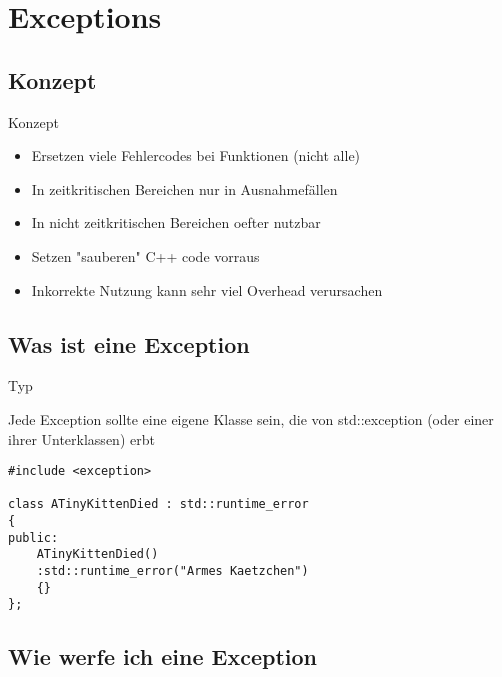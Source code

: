\section{Exceptions}


\subsection{Konzept}

\begin{frame}{Konzept}
	\begin{itemize}
		\item Ersetzen viele Fehlercodes bei Funktionen (nicht alle)
		\item In zeitkritischen Bereichen nur in Ausnahmefällen
		\item In nicht zeitkritischen Bereichen oefter nutzbar
		\item Setzen "sauberen" C++ code vorraus
		\item Inkorrekte Nutzung kann sehr viel Overhead verursachen
	\end{itemize}
\end{frame}

\subsection{Was ist eine Exception}

\begin{frame}[fragile]{Typ}

Jede Exception sollte eine eigene Klasse sein, die von std::exception (oder einer ihrer Unterklassen) erbt

	\begin{lstlisting}[]
#include <exception>

class ATinyKittenDied : std::runtime_error
{
public:
	ATinyKittenDied()
	:std::runtime_error("Armes Kaetzchen")
	{}
};
	\end{lstlisting}
\end{frame}

\subsection{Wie werfe ich eine Exception}

